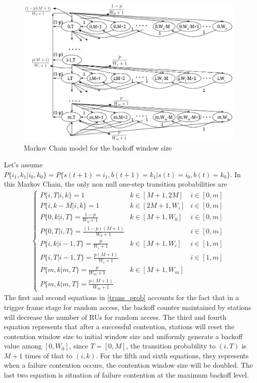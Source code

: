 \begin{figure}[!t]
    \centering
\includegraphics[scale=.4]{./figure/chp3/Markov_chain.png}
\caption{Markov Chain model for the backoff window size}
\label{Markov}
\end{figure}

Let's assume $P\lbrace i_1, k_1|i_0,k_0\rbrace = P\lbrace s(t+1) = i_1, b(t+1)= k_1|s(t) = i_0, b(t) = k_0\rbrace $. In this Markov Chain, the only non null one-step transition probabilities are 
\begin{align}
\left\lbrace
\begin{array}{lll}
P\lbrace i, T | i, k \rbrace = 1  						& k\in [M+1,2M]			& i \in [0,m]\\ [3pt]
P\lbrace i, k-M | i, k \rbrace = 1  						& k\in [2M+1,W_i]   		& i \in [0,m]\\ [3pt]
P\lbrace 0, k | i, T \rbrace = \frac{1-p}{W_0+1}  		& k\in [M+1,W_0]			& i \in [0,m]\\ [3pt]
P\lbrace 0, T | i, T \rbrace = \frac{(1-p)(M+1)}{W_0+1}  &						& i \in [0,m]\\ [3pt]
P\lbrace i, k | i-1, T \rbrace = \frac{p}{W_i+1} 		& k\in [M+1,W_i] 		& i \in [1,m]\\ [3pt]
P\lbrace i, T | i-1, T \rbrace = \frac{p(M+1)}{W_i+1}    &  						& i \in [1,m]\\ [3pt]
P\lbrace m, k | m, T \rbrace = \frac{p}{W_m+1} 		 	& k\in [M+1,W_m] 		& \\ [3pt]
P\lbrace m, k | m, T \rbrace = \frac{p(M+1)}{W_m+1}
\end{array}
\right.
\label{trans_prob}
\end{align}
The first and second equations in \ref{trans_prob} accounts for the fact that in a trigger frame stage for random access, the backoff counter maintained by stations will decrease the number of RUs for random access. 
The third and fourth equation represents that after a successful contention, stations will reset the contention window size to initial window size and uniformly generate a backoff value among $[0,W_0]$, since $T = [0,M]$, the transition probability to $( i, T )$ is $M+1$ times of that to $( i, k )$. 
For the fifth and sixth equations, they represents when a failure contention occurs, the contention window size will be doubled. 
The last two equation is situation of failure contention at the maximum backoff level.

